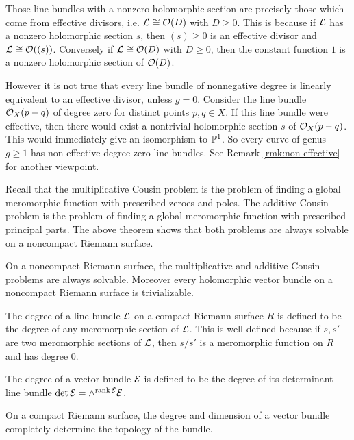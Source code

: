 \documentclass[12pt]{article}
\begin{document}
\begin{remark}
    Those line bundles with a nonzero holomorphic section are precisely those which come from effective divisors, i.e. $\cL \cong \cO(D)$ with $D \geq 0$. This is because if $\cL$ has a nonzero holomorphic section $s$, then $(s) \geq 0$ is an effective divisor and $\cL \cong \cO((s))$. Conversely if $\cL \cong \cO(D)$ with $D \geq 0$, then the constant function $1$ is a nonzero holomorphic section of $\cO(D)$.

However it is not true that every line bundle of nonnegative degree is linearly equivalent to an effective divisor, unless $g=0$. Consider the line bundle $\cO_X(p - q)$ of degree zero for distinct points $p,q \in X$. If this line bundle were effective, then there would exist a nontrivial holomorphic section $s$ of $\cO_X(p - q)$. This would immediately give an isomorphism to $\P^1$. So every curve of genus $g \geq 1$ has non-effective degree-zero line bundles. See Remark \ref{rmk:non-effective} for another viewpoint.
\end{remark}

Recall that the multiplicative Cousin problem is the problem of finding a global meromorphic function with prescribed zeroes and poles. The additive Cousin problem is the problem of finding a global meromorphic function with prescribed principal parts. The above theorem shows that both problems are always solvable on a noncompact Riemann surface.
\begin{theorem}
    On a noncompact Riemann surface, the multiplicative and additive Cousin problems are always solvable. Moreover every holomorphic vector bundle on a noncompact Riemann surface is trivializable.
\end{theorem}

\begin{definition}
     The degree of a line bundle $\cL$ on a compact Riemann surface $R$ is defined to be the degree of any meromorphic section of $\cL$. This is well defined because if $s,s'$ are two meromorphic sections of $\cL$, then $s/s'$ is a meromorphic function on $R$ and has degree $0$.

    The degree of a vector bundle $\cE$ is defined to be the degree of its determinant line bundle $\det \cE = \wedge^{\operatorname{rank} \cE} \cE$.
\end{definition}

\begin{fact}
On a compact Riemann surface, the degree and dimension of a vector bundle completely determine the topology of the bundle.
\end{fact}
\end{document}
